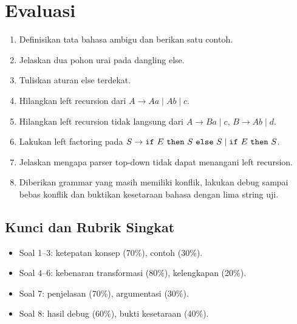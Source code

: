 \section*{Evaluasi}

\begin{enumerate}[label=\arabic*.,leftmargin=*]
  \item Definisikan tata bahasa ambigu dan berikan satu contoh.
  \item Jelaskan dua pohon urai pada dangling else.
  \item Tuliskan aturan else terdekat.
  \item Hilangkan left recursion dari \(A \to A a \mid A b \mid c\).
  \item Hilangkan left recursion tidak langsung dari
        \(A \to B a \mid c\), \(B \to A b \mid d\).
  \item Lakukan left factoring pada
        \(S \to \texttt{if}\ E\ \texttt{then}\ S\ \texttt{else}\ S
        \mid \texttt{if}\ E\ \texttt{then}\ S\).
  \item Jelaskan mengapa parser top-down tidak dapat menangani left
        recursion.
  \item Diberikan grammar yang masih memiliki konflik, lakukan debug
        sampai bebas konflik dan buktikan kesetaraan bahasa dengan lima
        string uji.
\end{enumerate}

\subsection*{Kunci dan Rubrik Singkat}
\begin{itemize}[leftmargin=*]
  \item Soal 1--3: ketepatan konsep (70\%), contoh (30\%).
  \item Soal 4--6: kebenaran transformasi (80\%), kelengkapan (20\%).
  \item Soal 7: penjelasan (70\%), argumentasi (30\%).
  \item Soal 8: hasil debug (60\%), bukti kesetaraan (40\%).
\end{itemize}
